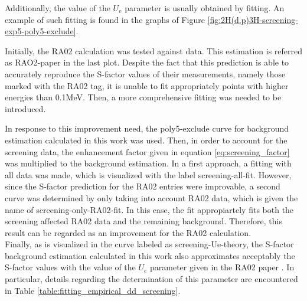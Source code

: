 \documentclass[openany]{book}
\begin{document}
Additionally, the value of the $U_e$ parameter is usually obtained by fitting. An example of such fitting is found in the graphs of Figure \ref{fig:2H(d,p)3H-screening-exp5-poly5-exclude}.


Initially, the RA02 calculation \cite{raiola_migliardi_gyurky_aliotta_formicola_bonetti_broggini_campajola_corvisiero_costantini_et_2002} was tested against data. This estimation is referred as RAO2-paper in the last plot. Despite the fact that this prediction is able to accurately reproduce the S-factor values of their measurements, namely those marked with the RA02 tag, it is unable to fit appropriately points with higher energies than 0.1MeV. Then, a more comprehensive fitting was needed to be introduced. 

In response to this improvement need, the poly5-exclude curve for background estimation calculated in this work was used. Then, in order to account for the screening data, the enhancement factor given in equation \ref{eq:screening_factor} was multiplied to the background estimation. In a first approach, a fitting with all data was made, which is visualized with the label screening-all-fit. However, since the S-factor prediction for the RA02 entries were improvable, a second curve was determined by only taking into account RA02 data, which is given the name of screening-only-RA02-fit. In this case, the fit appropiartely fits both the screening affected RA02 data and the remaining  background. Therefore, this result can be regarded as an improvement for the RA02 calculation. \\

Finally, as is visualized in the curve labeled as screening-Ue-theory, the S-factor background estimation calculated in this work also approximates acceptably the S-factor values with the value of the $U_e$ parameter given in the RA02 paper \cite{raiola_migliardi_gyurky_aliotta_formicola_bonetti_broggini_campajola_corvisiero_costantini_et_2002}. In particular, details regarding the determination of this parameter are encountered in Table \ref{table:fitting_empirical_dd_screening}. \\
\end{document}
